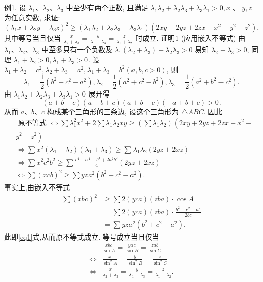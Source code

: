 例1. 设 $\lambda_1 、 \lambda_2 、 \lambda_3$ 中至少有两个正数, 且满足 $\lambda_1 \lambda_2+\lambda_2 \lambda_3+\lambda_3 \lambda_1>0, x$ 、 $y, z$ 为任意实数, 求证:
$$
\left(\lambda_1 x+\lambda_2 y+\lambda_3 z\right)^2 \geqslant\left(\lambda_1 \lambda_2+\lambda_2 \lambda_3+\lambda_3 \lambda_1\right)\left(2 x y+2 y z+2 z x-x^2-y^2-z^2\right),
$$
其中等号当且仅当 $\frac{x}{\lambda_2+\lambda_3}=\frac{y}{\lambda_1+\lambda_3}=\frac{z}{\lambda_1+\lambda_2}$ 时成立.
证明1 (应用嵌入不等式)
由 $\lambda_1 、 \lambda_2 、 \lambda_3$ 中至多只有一个负数及 $\lambda_1\left(\lambda_2+\lambda_3\right)+\lambda_2 \lambda_3>0$ 易知 $\lambda_2+ \lambda_3>0$, 同理 $\lambda_1+\lambda_2>0, \lambda_1+\lambda_3>0$.
设 $\lambda_1+\lambda_2=c^2, \lambda_2+\lambda_3=a^2, \lambda_1+\lambda_3=b^2(a, b, c>0)$, 则
$$
\lambda_1=\frac{1}{2}\left(b^2+c^2-a^2\right), \lambda_2=\frac{1}{2}\left(a^2+c^2-b^2\right), \lambda_3=\frac{1}{2}\left(a^2+b^2-c^2\right) .
$$
由 $\lambda_1 \lambda_2+\lambda_2 \lambda_3+\lambda_3 \lambda_1>0$ 展开得
$$
(a+b+c)(a-b+c)(a+b-c)(-a+b+c)>0 .
$$
从而 $a 、 b 、 c$ 构成某个三角形的三条边, 设这个三角形为 $\triangle A B C$. 因此
$$
\begin{aligned}
& \text { 原不等式 } \Leftrightarrow \sum \lambda_1^2 x^2+2 \sum \lambda_1 \lambda_2 x y \geqslant\left(\sum \lambda_1 \lambda_2\right)\left(2 x y+2 y z+2 z x-x^2-\right. \\
&\left.y^2-z^2\right) \\
& \Leftrightarrow \sum x^2\left(\lambda_1+\lambda_2\right)\left(\lambda_1+\lambda_3\right) \geqslant \sum \lambda_1 \lambda_2(2 y z+2 x z) \\
& \Leftrightarrow \sum x^2 c^2 b^2 \geqslant \sum \frac{c^4-a^4-b^4+2 a^2 b^2}{4}(2 y z+2 x z) \\
& \Leftrightarrow \sum(x c b)^2 \geqslant \sum y z a^2\left(b^2+c^2-a^2\right) . \label{eq1}
\end{aligned}
$$
事实上,由嵌入不等式
$$
\begin{aligned}
\sum(x b c)^2 & \geqslant \sum 2(y c a)(z b a) \cdot \cos A \\
& =\sum 2(y c a)(z b a) \cdot \frac{b^2+c^2-a^2}{2 b c} \\
& =\sum y z a^2\left(b^2+c^2-a^2\right) .
\end{aligned}
$$
此即\ref{eq1}式,从而原不等式成立.
等号成立当且仅当
$$
\begin{aligned}
& \frac{x b c}{\sin A}=\frac{y a c}{\sin B}=\frac{z a b}{\sin C} \\
\Leftrightarrow & \frac{x}{\sin ^2 A}=\frac{y}{\sin ^2 B}=\frac{z}{\sin ^2 C} \\
\Leftrightarrow & \frac{x}{\lambda_2+\lambda_3}=\frac{y}{\lambda_1+\lambda_3}=\frac{z}{\lambda_1+\lambda_2} .
\end{aligned}
$$



